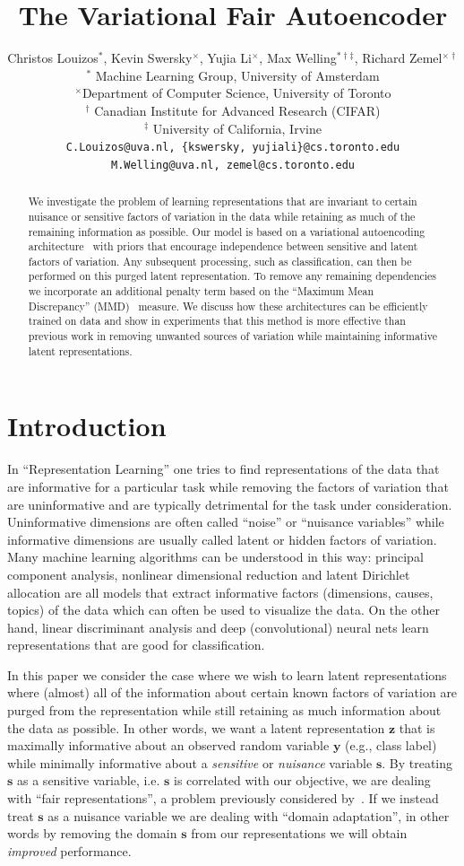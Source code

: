 \documentclass{article} %
\title{The Variational Fair Autoencoder}
\author{Christos Louizos$^*$, Kevin Swersky$^\times$, Yujia Li$^\times$, Max Welling$^{*\dagger\ddagger}$, Richard Zemel$^{\times\dagger}$\\
	$^*$ Machine Learning Group, University of Amsterdam\\
	$^\times$Department of Computer Science, University of Toronto\\
	$^\dagger$ Canadian Institute for Advanced Research (CIFAR)\\
	$^\ddagger$ University of California, Irvine\\
	\texttt{C.Louizos@uva.nl, \{kswersky, yujiali\}@cs.toronto.edu}\\
	\texttt{M.Welling@uva.nl, zemel@cs.toronto.edu}}
\def\*#1{\mathbf{#1}}
\begin{document}
\maketitle

\begin{abstract}
We investigate the problem of learning representations that are invariant to certain nuisance or sensitive factors of variation in the data while retaining as much of the remaining information as possible. Our model is based on a variational autoencoding architecture~\citep{kingma2013auto, rezende2014stochastic} with priors that encourage independence between sensitive and latent factors of variation. Any subsequent processing, such as classification, can then be performed on this purged latent representation. To remove any remaining dependencies we incorporate an additional penalty term based on the ``Maximum Mean Discrepancy'' (MMD)~\citep{gretton2006kernel} measure. We discuss how these architectures can be efficiently trained on data and show in experiments that this method is more effective than previous work in removing unwanted sources of variation while maintaining informative latent representations. 
\end{abstract}

\section{Introduction} 
In ``Representation Learning'' one tries to find representations of the data that are informative for a particular task while removing the factors of variation that are uninformative and are typically detrimental for the task under consideration. Uninformative dimensions are often called ``noise'' or ``nuisance variables'' while informative dimensions are usually called latent or hidden factors of variation. Many machine learning algorithms can be understood in this way: principal component analysis, nonlinear dimensional reduction and latent Dirichlet allocation are all models that extract informative factors (dimensions, causes, topics) of the data which can often be used to visualize the data. On the other hand, linear discriminant analysis and deep (convolutional) neural nets learn representations that are good for classification. 

In this paper we  consider the case where we wish to learn latent representations where (almost) all of the information about certain known factors of variation are purged from the representation while still retaining as much information about the data as possible. In other words, we want a latent representation $\*z$ that is maximally informative about an observed random variable $\*y$ (e.g., class label) while minimally informative about a \emph{sensitive} or \emph{nuisance} variable $\*s$. By treating $\*s$ as a sensitive variable, i.e. $\*s$ is correlated with our objective, we are dealing with ``fair representations'', a problem previously considered by~\cite{zemel2013learning}. If we instead treat $\*s$ as a nuisance variable we are dealing with ``domain adaptation'', in other words by removing the domain $\*s$ from our representations we will obtain \emph{improved} performance.
\end{document}

